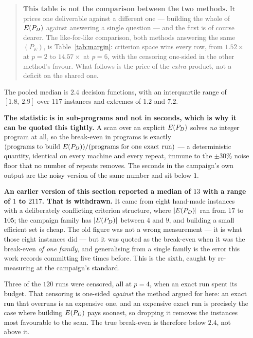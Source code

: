 \documentclass[11pt,a4paper]{article}
\begin{document}
\begin{quote}
\textbf{This table is not the comparison between the two methods.}  It prices
one deliverable against a different one --- building the whole of $E(P_{D})$ against
answering a single question --- and the first is of course dearer.  The
like-for-like comparison, both methods answering the same $(P_E)$, is
Table~\ref{tab:margin}: criterion space wins every row, from $1.52\times$ at
$p=2$ to $14.57\times$ at $p=6$, with the censoring one-sided in the other
method's favour.  What follows is the price of the \emph{extra} product, not a
deficit on the shared one.
\end{quote}

\noindent
The pooled median is $\mathbf{2.4}$ decision functions, with an interquartile
range of $[1.8,\ 2.9]$ over $117$ instances and extremes of $1.2$ and $7.2$.

\textbf{The statistic is in sub-programs and not in seconds, which is why it
can be quoted this tightly.}  A scan over an explicit $E(P_{D})$ solves \emph{no}
integer program at all, so the break-even in programs is exactly
$(\text{programs to build } E(P_{D})) / (\text{programs for one exact run})$ --- a
deterministic quantity, identical on every machine and every repeat, immune to
the $\pm 30\%$ noise floor that no number of repeats removes.  The seconds in
the campaign's own output are the noisy version of the same number and sit
below $1$.

\textbf{An earlier version of this section reported a median of $13$ with a
range of $1$ to $2117$.  That is withdrawn.}  It came from eight hand-made
instances with a deliberately conflicting criterion structure, where
$|E(P_{D})|$ ran from $17$ to $105$; the campaign family has $|E(P_{D})|$ between $4$ and
$9$, and building a small efficient set is cheap.  The old figure was not a
wrong measurement --- it is what those eight instances did --- but it was
quoted as the break-even when it was the break-even \emph{of one family}, and
generalising from a single family is the error this work records committing
five times before.  This is the sixth, caught by re-measuring at the
campaign's standard.

Three of the $120$ runs were censored, all at $p=4$, when an exact run spent
its budget.  That censoring is one-sided \emph{against} the method argued for
here: an exact run that overruns is an expensive one, and an expensive exact
run is precisely the case where building $E(P_{D})$ pays soonest, so dropping it
removes the instances most favourable to the scan.  The true break-even is
therefore below $2.4$, not above it.
\end{document}
